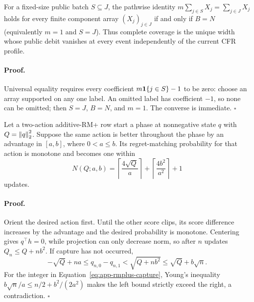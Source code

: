 \begin{proposition}
\label{prop:app-unique-zero-debit-width}
For a fixed-size public batch $S\subseteq J$, the pathwise identity
$m\sum_{j\in S}X_j=\sum_{j\in J}X_j$ holds for every finite component array
$(X_j)_{j\in J}$ if and only if $B=N$ (equivalently $m=1$ and $S=J$).
Thus complete coverage is the unique width whose public debit vanishes at
every event independently of the current CFR profile.
\end{proposition}

\paragraph{Proof.}
Universal equality requires every coefficient
$m\mathbf 1\{j\in S\}-1$ to be zero: choose an array supported on any one label.
An omitted label has coefficient $-1$, so none can be omitted; then $S=J$,
$B=N$, and $m=1$.  The converse is immediate.  \hfill$\square$

\begin{lemma}
\label{lem:app-rmplus-phase-capture}
Let a two-action additive-RM+ row start a phase at nonnegative state $q$ with
$Q=\left\lVert q \right\rVert_2^2$.  Suppose the same action is better throughout the phase by
an advantage in $[a,b]$, where $0<a\le b$.  Its regret-matching probability
for that action is monotone and becomes one within
\begin{equation}
N(Q;a,b)=\left\lceil\frac{4\sqrt Q}{a}\right\rceil
+\left\lceil\frac{4b^2}{a^2}\right\rceil+1
\label{eq:app-rmplus-capture}
\end{equation}
updates.
\end{lemma}

\paragraph{Proof.}
Orient the desired action first.  Until the other score clips, its score
difference increases by the advantage and the desired probability is
monotone.  Centering gives $q^\top h=0$, while projection can only decrease
norm, so after $n$ updates $Q_n\le Q+nb^2$.  If capture has not occurred,
\[
-\sqrt Q+na\le q_{n,0}-q_{n,1}<\sqrt{Q+nb^2}
\le\sqrt Q+b\sqrt n.
\]
For the integer in Equation~\ref{eq:app-rmplus-capture}, Young's inequality
$b\sqrt n/a\le n/2+b^2/(2a^2)$ makes the left bound strictly exceed the
right, a contradiction. \hfill$\square$

